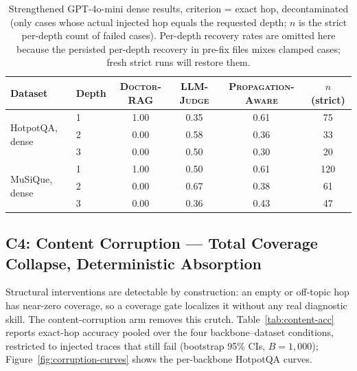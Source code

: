 \documentclass[11pt]{article}
\newcommand{\dr}{\textnormal{\textsc{Doctor-RAG}}}
\newcommand{\pa}{\textnormal{\textsc{Propagation-Aware}}}
\newcommand{\lj}{\textnormal{\textsc{LLM-Judge}}}
\begin{document}
\begin{table}[t]
\centering
\small
\begin{tabular}{llcccc}
\toprule
Dataset & Depth & \dr{} & \lj{} & \pa{} & $n$ (strict) \\
\midrule
\multirow{3}{*}{HotpotQA, dense}
  & 1 & 1.00 & 0.35 & 0.61 & 75 \\
  & 2 & 0.00 & 0.58 & 0.36 & 33 \\
  & 3 & 0.00 & 0.50 & 0.30 & 20 \\
\midrule
\multirow{3}{*}{MuSiQue, dense}
  & 1 & 1.00 & 0.50 & 0.61 & 120 \\
  & 2 & 0.00 & 0.67 & 0.38 & 61 \\
  & 3 & 0.00 & 0.36 & 0.43 & 47 \\
\bottomrule
\end{tabular}
\caption{Strengthened GPT-4o-mini dense results, criterion = exact hop,
decontaminated (only cases whose actual injected hop equals the requested
depth; $n$ is the strict per-depth count of failed cases).  Per-depth recovery
rates are omitted here because the persisted per-depth recovery in pre-fix
files mixes clamped cases; fresh strict runs will restore them.}
\label{tab:dense-openai}
\end{table}

\subsection{C4: Content Corruption --- Total Coverage Collapse, Deterministic Absorption}
\label{sec:content-results}

Structural interventions are detectable by construction: an empty or off-topic
hop has near-zero coverage, so a coverage gate localizes it without any real
diagnostic skill.  The content-corruption arm removes this crutch.
Table~\ref{tab:content-acc} reports exact-hop accuracy pooled over the four
backbone--dataset conditions, restricted to injected traces that still fail
(bootstrap 95\% CIs, $B{=}1{,}000$); Figure~\ref{fig:corruption-curves} shows
the per-backbone HotpotQA curves.
\end{document}
